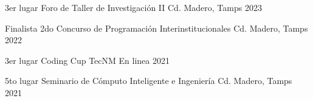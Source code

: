 



\begin{cvhonors}

  \cvhonor
    {3er lugar} %
    {Foro de Taller de Investigación II} %
    {Cd. Madero, Tamps} %
    {2023} %

  \cvhonor
    {Finalista} %
    {2do Concurso de Programación Interinstitucionales} %
    {Cd. Madero, Tamps} %
    {2022} %

  \cvhonor
    {3er lugar} %
    {Coding Cup TecNM} %
    {En linea} %
    {2021} %

  \cvhonor
    {5to lugar} %
    {Seminario de Cómputo Inteligente e Ingeniería} %
    {Cd. Madero, Tamps} %
    {2021} %

\end{cvhonors}

